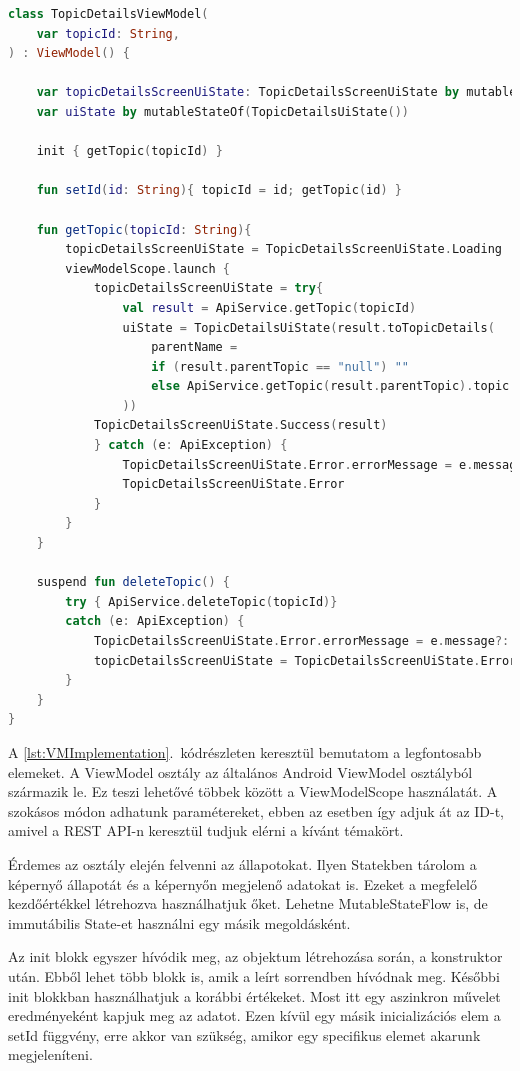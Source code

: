 \begin{lstlisting}[caption={ViewModel implementációja.}, label={lst:VMImplementation}, language=Kotlin]
class TopicDetailsViewModel(
    var topicId: String,
) : ViewModel() {

    var topicDetailsScreenUiState: TopicDetailsScreenUiState by mutableStateOf(TopicDetailsScreenUiState.Loading)
    var uiState by mutableStateOf(TopicDetailsUiState())
    
    init { getTopic(topicId) }

    fun setId(id: String){ topicId = id; getTopic(id) }

    fun getTopic(topicId: String){
        topicDetailsScreenUiState = TopicDetailsScreenUiState.Loading
        viewModelScope.launch {
            topicDetailsScreenUiState = try{
                val result = ApiService.getTopic(topicId)
                uiState = TopicDetailsUiState(result.toTopicDetails(
                    parentName =
                    if (result.parentTopic == "null") ""
                    else ApiService.getTopic(result.parentTopic).topic
                ))
            TopicDetailsScreenUiState.Success(result)
            } catch (e: ApiException) {
                TopicDetailsScreenUiState.Error.errorMessage = e.message?: "Unkown error"
                TopicDetailsScreenUiState.Error
            }
        }
    }

    suspend fun deleteTopic() {
        try { ApiService.deleteTopic(topicId)} 
        catch (e: ApiException) {
            TopicDetailsScreenUiState.Error.errorMessage = e.message?: "Unkown error"
            topicDetailsScreenUiState = TopicDetailsScreenUiState.Error
        }
    }
}
\end{lstlisting}

A \ref{lst:VMImplementation}.~kódrészleten keresztül bemutatom a legfontosabb elemeket.
A ViewModel osztály az általános Android ViewModel osztályból származik le.
Ez teszi lehetővé többek között a ViewModelScope használatát.
A szokásos módon adhatunk paramétereket, ebben az esetben így adjuk át az ID-t, amivel a REST API-n keresztül tudjuk elérni a kívánt témakört.

Érdemes az osztály elején felvenni az állapotokat.
Ilyen Statekben tárolom a képernyő állapotát és a képernyőn megjelenő adatokat is.
Ezeket a megfelelő kezdőértékkel létrehozva használhatjuk őket.
Lehetne MutableStateFlow is, de immutábilis State-et használni egy másik megoldásként.

Az init{} blokk egyszer hívódik meg, az objektum létrehozása során, a konstruktor után. Ebből lehet több blokk is, amik a leírt sorrendben hívódnak meg. Későbbi init blokkban használhatjuk a korábbi értékeket.
Most itt egy aszinkron művelet eredményeként kapjuk meg az adatot.
Ezen kívül egy másik inicializációs elem a setId függvény, erre akkor van szükség, amikor egy specifikus elemet akarunk megjeleníteni.

